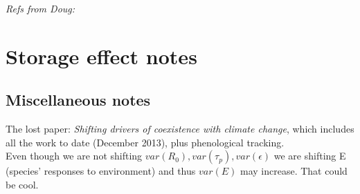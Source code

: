 \documentclass[11pt,a4paper,oneside]{article}
\begin{document}
\noindent \emph{Refs from Doug:} \citep{Davison2010,morris2008,Tuljapurkar2009}

\section{Storage effect notes}

\subsection{Miscellaneous notes}

\noindet The lost paper: \emph{Shifting drivers of coexistence with climate change}, which includes all the work to date (December 2013), plus phenological tracking.\\

 Even though we are not shifting \(var(R_{0}), var(\tau_{p}), var(\epsilon)\) we are shifting E (species' responses to environment) and thus \(var(E)\) may increase. That could be cool.\\
\end{document}
